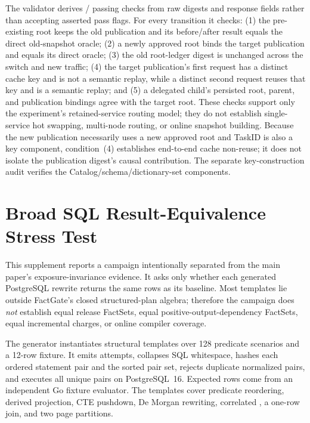 \documentclass[journal,onecolumn]{IEEEtran}
\newcommand{\code}[1]{\texttt{\detokenize{#1}}}
\begin{document}
The validator derives \RQFiveChecksPassed{}/\RQFiveChecksTotal{} passing checks
from raw digests and response fields rather than accepting asserted pass flags.
For every transition it checks: (1) the pre-existing root keeps the old
publication and its before/after result equals the direct old-snapshot oracle;
(2) a newly approved root binds the target publication and equals its direct
oracle; (3) the old root-ledger digest is unchanged across the switch and new
traffic; (4) the target publication's first request has a distinct cache key
and is not a semantic replay, while a distinct second request reuses that key
and is a semantic replay; and (5) a delegated child's persisted root, parent,
and publication bindings agree with the target root. These checks support only
the experiment's retained-service routing model; they do not establish
single-service hot swapping, multi-node routing, or online snapshot building.
Because the new publication necessarily uses a new approved root and TaskID is
also a key component, condition~(4) establishes end-to-end cache non-reuse; it
does not isolate the publication digest's causal contribution. The separate
key-construction audit verifies the Catalog/schema/dictionary-set components.


\section{Broad SQL Result-Equivalence Stress Test}

This supplement reports a campaign intentionally separated from the main
paper's exposure-invariance evidence.  It asks only whether each generated
PostgreSQL rewrite returns the same rows as its baseline.  Most templates lie
outside FactGate's closed structured-plan algebra; therefore the campaign does
\emph{not} establish equal release FactSets, equal positive-output-dependency
FactSets, equal incremental charges, or online compiler coverage.

The generator instantiates \RQTwoTemplates{} structural templates over 128
predicate scenarios and a 12-row fixture.  It emits \RQTwoPairs{} attempts,
collapses SQL whitespace, hashes each ordered statement pair and the sorted
pair set, rejects duplicate normalized pairs, and executes all
\RQTwoUnique{} unique pairs on PostgreSQL~16. Expected rows come from an
independent Go fixture evaluator.  The templates cover predicate reordering,
derived projection, CTE pushdown, De Morgan rewriting, correlated
\code{EXISTS}, a one-row \code{VALUES} join, and two page partitions.
\end{document}
